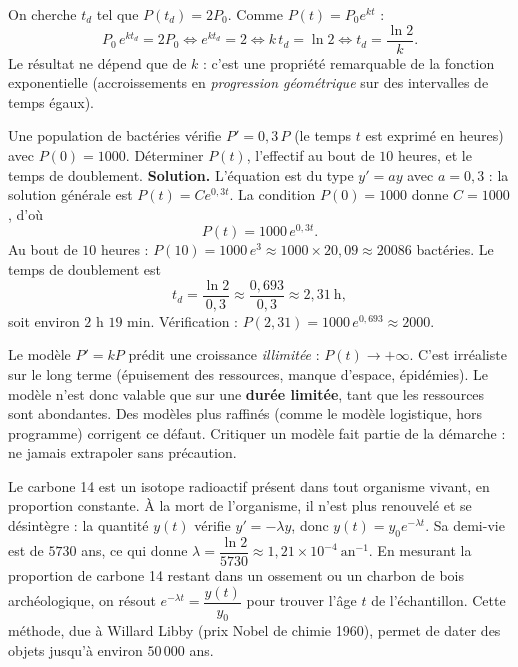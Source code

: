 \documentclass[11pt]{article}
\begin{document}
\begin{experience}
On cherche $t_d$ tel que $P(t_d) = 2P_0$. Comme $P(t) = P_0 e^{kt}$ :
\[ P_0\, e^{k t_d} = 2P_0 \iff e^{k t_d} = 2 \iff k\,t_d = \ln 2 \iff t_d = \frac{\ln 2}{k}. \]
Le résultat ne dépend que de $k$ : c'est une propriété remarquable de la fonction exponentielle (accroissements en \emph{progression géométrique} sur des intervalles de temps égaux).
\end{experience}

\begin{exoresolu}
Une population de bactéries vérifie $P' = 0{,}3\,P$ (le temps $t$ est exprimé en heures) avec $P(0) = 1000$. Déterminer $P(t)$, l'effectif au bout de $10$ heures, et le temps de doublement.
\tcblower
\textbf{Solution.} L'équation est du type $y' = ay$ avec $a = 0{,}3$ : la solution générale est $P(t) = C e^{0{,}3t}$. La condition $P(0) = 1000$ donne $C = 1000$, d'où
\[ P(t) = 1000\, e^{0{,}3t}. \]
Au bout de $10$ heures : $P(10) = 1000\, e^{3} \approx 1000 \times 20{,}09 \approx \num{20086}$ bactéries. Le temps de doublement est
\[ t_d = \frac{\ln 2}{0{,}3} \approx \frac{0{,}693}{0{,}3} \approx 2{,}31 \ \text{h}, \]
soit environ $2$ h $19$ min. Vérification : $P(2{,}31) = 1000\,e^{0{,}693} \approx 2000$.
\end{exoresolu}

\begin{attention}
Le modèle $P' = kP$ prédit une croissance \emph{illimitée} : $P(t) \to +\infty$. C'est irréaliste sur le long terme (épuisement des ressources, manque d'espace, épidémies). Le modèle n'est donc valable que sur une \textbf{durée limitée}, tant que les ressources sont abondantes. Des modèles plus raffinés (comme le modèle logistique, hors programme) corrigent ce défaut. Critiquer un modèle fait partie de la démarche : ne jamais extrapoler sans précaution.
\end{attention}

\begin{savaistu}
Le carbone 14 est un isotope radioactif présent dans tout organisme vivant, en proportion constante. À la mort de l'organisme, il n'est plus renouvelé et se désintègre : la quantité $y(t)$ vérifie $y' = -\lambda y$, donc $y(t) = y_0 e^{-\lambda t}$. Sa demi-vie est de $5730$ ans, ce qui donne $\lambda = \dfrac{\ln 2}{5730} \approx 1,21 \times 10^{-4}\ \text{an}^{-1}$. En mesurant la proportion de carbone 14 restant dans un ossement ou un charbon de bois archéologique, on résout $e^{-\lambda t} = \dfrac{y(t)}{y_0}$ pour trouver l'âge $t$ de l'échantillon. Cette méthode, due à Willard Libby (prix Nobel de chimie 1960), permet de dater des objets jusqu'à environ $50\,000$ ans.
\end{savaistu}
\end{document}
